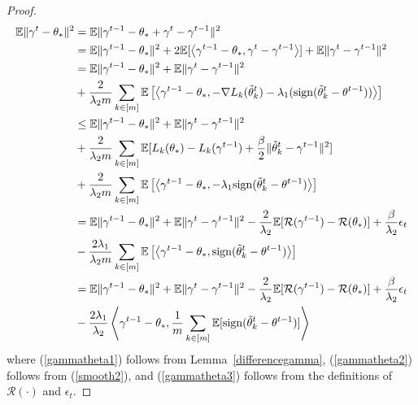 \documentclass{article} %
\begin{document}
\begin{proof}
\begin{align}
    \mathbb{E}\lVert \gamma^t-\theta_* \rVert^2 
    &\nonumber=\mathbb{E}\lVert \gamma^{t-1}-\theta_*+\gamma^t-\gamma^{t-1} \rVert^2\\ 
    &\nonumber=\mathbb{E}\lVert \gamma^{t-1}-\theta_* \rVert^2+2\mathbb{E}[ \left\langle \gamma^{t-1}-\theta_*,\gamma^t-\gamma^{t-1} \right\rangle]+\mathbb{E}\lVert \gamma^t-\gamma^{t-1} \rVert^2\\
    &\nonumber\label{gammatheta1}=\mathbb{E}\lVert \gamma^{t-1}-\theta_* \rVert^2+\mathbb{E}\lVert \gamma^t-\gamma^{t-1} \rVert^2\\ 
    &+\frac{2}{\lambda_2 m}\sum_{k\in [m]}\mathbb{E}\left[ \left\langle \gamma^{t-1}-\theta_*,-\nabla L_k(\Tilde{\theta}_k^t)-\lambda_1(\mathrm{sign}(\tilde{\theta}_k^t-\theta^{t-1})) \right\rangle\right]
    \\
    &\le \label{gammatheta2} \nonumber\mathbb{E}\lVert \gamma^{t-1}-\theta_* \rVert^2+\mathbb{E}\lVert \gamma^t-\gamma^{t-1} \rVert^2\\ 
    &\nonumber+\frac{2}{\lambda_2 m}\sum_{k\in [m]}\mathbb{E}[L_k(\theta_*)-L_k(\gamma^{t-1})+\frac{\beta}{2}\lVert \Tilde{\theta}_k^t-\gamma^{t-1} \rVert^2]\\ 
    &+\frac{2}{\lambda_2 m}\sum_{k\in [m]}\mathbb{E}\left[ \left\langle \gamma^{t-1}-\theta_*,-\lambda_1\mathrm{sign}(\tilde{\theta}_k^t-\theta^{t-1}) \right\rangle\right]\\
    &= \label{gammatheta3}\nonumber\mathbb{E}\lVert \gamma^{t-1}-\theta_* \rVert^2+\mathbb{E}\lVert \gamma^t-\gamma^{t-1} \rVert^2-\frac{2}{\lambda_2}\mathbb{E}[\mathcal{R}(\gamma^{t-1})-\mathcal{R}(\theta_*)]+\frac{\beta}{\lambda_2}\epsilon_t\\ 
    &-\frac{2\lambda_1}{\lambda_2 m}\sum_{k\in [m]}\mathbb{E}\left[\left\langle \gamma^{t-1}-\theta_*,\mathrm{sign}(\tilde{\theta}_k^t-\theta^{t-1})\right\rangle \right]\\ 
    &\nonumber\label{gammatheta4}=\mathbb{E}\lVert \gamma^{t-1}-\theta_* \rVert^2+\mathbb{E}\lVert \gamma^t-\gamma^{t-1} \rVert^2-\frac{2}{\lambda_2}\mathbb{E}[\mathcal{R}(\gamma^{t-1})-\mathcal{R}(\theta_*)]+\frac{\beta}{\lambda_2}\epsilon_t\\
    &-\frac{2\lambda_1}{\lambda_2 }\left\langle {\gamma^{t-1}-\theta_*}, \frac{1}{m}\sum_{k\in [m]}\mathbb{E}[\mathrm{sign}(\tilde{\theta}_k^t-\theta^{t-1})]\right\rangle
\end{align}
where (\ref{gammatheta1}) follows from Lemma~\ref{differencegamma}, (\ref{gammatheta2}) follows from (\ref{smooth2}), and (\ref{gammatheta3}) follows from the definitions of $\mathcal{R}(\cdot)$ and $\epsilon_t$.%
\end{proof}
\end{document}
